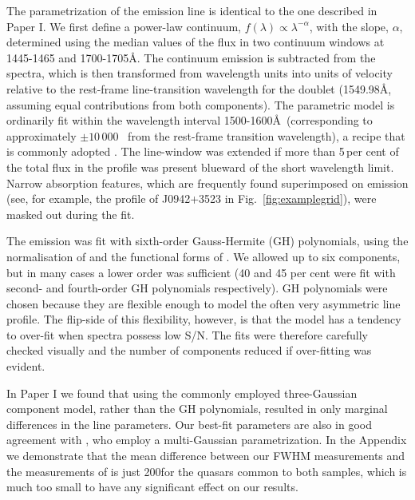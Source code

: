 The parametrization of the  emission line is identical to the one described in Paper I. 
We first define a power-law continuum, $f(\lambda) \propto \lambda^{-\alpha}$, with the slope, $\alpha$, determined using the median values of the flux in two continuum windows at 1445-1465 and 1700-1705\AA. 
The continuum emission is subtracted from the spectra, which is then transformed from wavelength units into units of velocity relative to the rest-frame line-transition wavelength for the  doublet (1549.98\AA, assuming equal contributions from both components). 
The parametric model is ordinarily fit within the wavelength interval 1500-1600\AA\, (corresponding to approximately $\pm 10\,000$ \kms\, from the rest-frame transition wavelength), a recipe that is commonly adopted \citep[e.g.][]{denney13}. 
The line-window was extended if more than 5\,per cent of the total flux in the profile was present blueward of the short wavelength limit. 
Narrow absorption features, which are frequently found superimposed on  emission (see, for example, the  profile of J0942+3523 in Fig.~\ref{fig:examplegrid}), were masked out during the fit. 

The  emission was fit with sixth-order Gauss-Hermite (GH) polynomials, using the normalisation of \citet{marel93} and the functional forms of \citet{cappellari02}. 
We allowed up to six components, but in many cases a lower order was sufficient (40 and 45 per cent were fit with second- and fourth-order GH polynomials respectively).
GH polynomials were chosen because they are flexible enough to model the often very asymmetric  line profile. 
The flip-side of this flexibility, however, is that the model has a tendency to over-fit when spectra possess low S/N. 
The fits were therefore carefully checked visually and the number of components reduced if over-fitting was evident.

In Paper I we found that using the commonly employed three-Gaussian component model, rather than the GH polynomials, resulted in only marginal differences in the line parameters. 
Our best-fit parameters are also in good agreement with \citet{shen11}, who employ a multi-Gaussian parametrization. 
In the Appendix we demonstrate that the mean difference between our FWHM measurements and the measurements of \citet{shen11} is just 200\kms for the quasars common to both samples, which is much too small to have any significant effect on our results.

